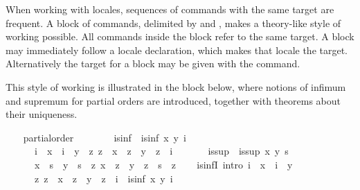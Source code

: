\begin{isabellebody}
\begin{isamarkuptext}
\end{isamarkuptext}%
\isamarkuptrue%
%
\isamarkuptrue%
%
\begin{isamarkuptext}%
When working with locales, sequences of commands with the same
  target are frequent.  A block of commands, delimited by
   and , makes a theory-like style
  of working possible.  All commands inside the block refer to the
  same target.  A block may immediately follow a locale
  declaration, which makes that locale the target.  Alternatively the
  target for a block may be given with the 
  command.

  This style of working is illustrated in the block below, where
  notions of infimum and supremum for partial orders are introduced,
  together with theorems about their uniqueness.%
\end{isamarkuptext}%
\isamarkuptrue%
\ \ \isamarkupfalse%
\ partial{\isacharunderscore}order\ \isanewline
\isanewline
\ \ \isamarkupfalse%
\isanewline
\ \ \ \ is{\isacharunderscore}inf\ \ {\isachardoublequoteopen}is{\isacharunderscore}inf\ x\ y\ i\ {\isacharequal}\isanewline
\ \ \ \ \ \ {\isacharparenleft}i\ {\isasymsqsubseteq}\ x\ {\isasymand}\ i\ {\isasymsqsubseteq}\ y\ {\isasymand}\ {\isacharparenleft}{\isasymforall}z{\isachardot}\ z\ {\isasymsqsubseteq}\ x\ {\isasymand}\ z\ {\isasymsqsubseteq}\ y\ {\isasymlongrightarrow}\ z\ {\isasymsqsubseteq}\ i{\isacharparenright}{\isacharparenright}{\isachardoublequoteclose}\isanewline
\isanewline
\ \ \isamarkupfalse%
\isanewline
\ \ \ \ is{\isacharunderscore}sup\ \ {\isachardoublequoteopen}is{\isacharunderscore}sup\ x\ y\ s\ {\isacharequal}\isanewline
\ \ \ \ \ \ {\isacharparenleft}x\ {\isasymsqsubseteq}\ s\ {\isasymand}\ y\ {\isasymsqsubseteq}\ s\ {\isasymand}\ {\isacharparenleft}{\isasymforall}z{\isachardot}\ x\ {\isasymsqsubseteq}\ z\ {\isasymand}\ y\ {\isasymsqsubseteq}\ z\ {\isasymlongrightarrow}\ s\ {\isasymsqsubseteq}\ z{\isacharparenright}{\isacharparenright}{\isachardoublequoteclose}\isanewline
%
\isadeliminvisible
\isanewline
\ \ %
\endisadeliminvisible
%
\isataginvisible
{}\isamarkupfalse%
\ is{\isacharunderscore}infI\ {\isacharbrackleft}intro{\isacharquery}{\isacharbrackright}{\isacharcolon}\ {\isachardoublequoteopen}i\ {\isasymsqsubseteq}\ x\ {\isasymLongrightarrow}\ i\ {\isasymsqsubseteq}\ y\ {\isasymLongrightarrow}\isanewline
\ \ \ \ \ \ {\isacharparenleft}{\isasymAnd}z{\isachardot}\ z\ {\isasymsqsubseteq}\ x\ {\isasymLongrightarrow}\ z\ {\isasymsqsubseteq}\ y\ {\isasymLongrightarrow}\ z\ {\isasymsqsubseteq}\ i{\isacharparenright}\ {\isasymLongrightarrow}\ is{\isacharunderscore}inf\ x\ y\ i{\isachardoublequoteclose}\isanewline

\end{isabellebody}
